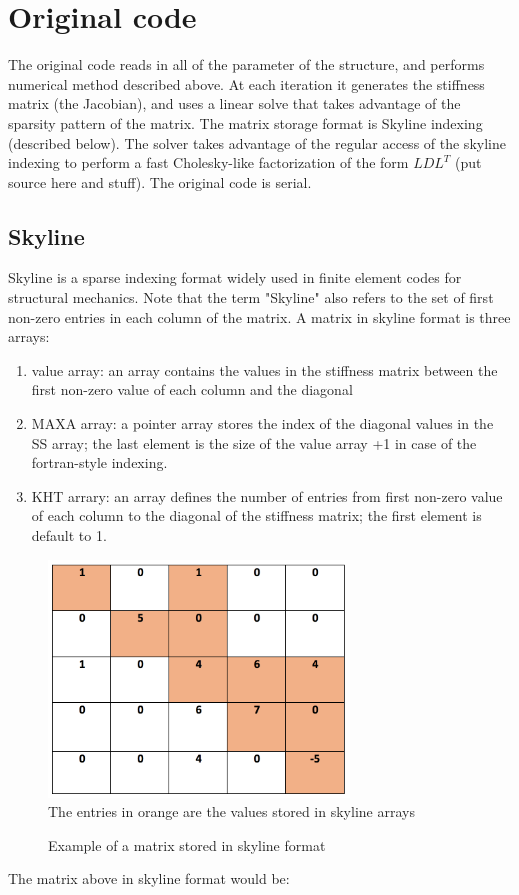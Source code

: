 \documentclass[11pt]{article}
\begin{document}
\section{Original code}\label{sec:originalCode}
The original code reads in all of the parameter of the structure, and performs numerical method described above. At each iteration it generates the stiffness matrix (the Jacobian), and uses a linear solve that takes advantage of the sparsity pattern of the matrix. The matrix storage format is Skyline indexing (described below). The solver takes advantage of the regular access of the skyline indexing to perform a fast Cholesky-like factorization of the form $LDL^T$ (put source here and stuff). The original code is serial.


\subsection{Skyline}
Skyline is a sparse indexing format widely used in finite element codes for structural mechanics. Note that the term "Skyline" also refers to the set of first non-zero entries in each column of the matrix. A matrix in skyline format is three arrays: 
\begin{enumerate}

\item value array: an array contains the values in the stiffness matrix between the first non-zero value of each column and the diagonal
\item MAXA array: a  pointer array stores the index of the diagonal values in the SS array; the last element is the size of the value array +1 in case of the fortran-style indexing.
\item KHT arrary: an array defines the number of entries from first non-zero value of each column to the diagonal of the stiffness matrix; the first element is default to 1. 
\end{enumerate}

\begin{figure}[h]
\begin{center}

\caption{Example of a matrix stored in skyline format}
\includegraphics[width=8cm]{skyline}
\label{fig:skyline}
\\
The entries in orange are the values stored in skyline arrays
\end{center}

\end{figure}
The matrix above in skyline format would be:
\end{document}
